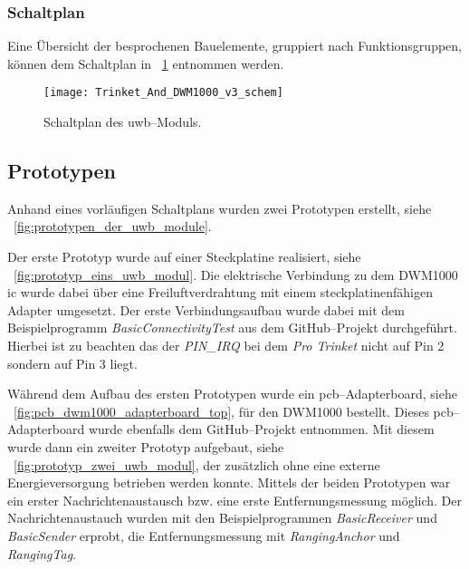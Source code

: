 \begin{comment}
- Schaltplan-Skizze
	- Besonderheiten (NetLabels)
	- SVG/PNG/PDF-Export
	- Gruppierung nach Funktionsgruppen
------------------------------------------------------------------------------------------
\end{comment}
\subsubsection{Schaltplan} \label{subsec:schaltplan_uwb_modul}

Eine Übersicht der besprochenen Bauelemente, gruppiert nach Funktionsgruppen, können dem Schaltplan in \figurename~\ref{fig:schaltplan_uwb_modul} entnommen werden.

\begin{figure}
	\texttt{[image: Trinket\_And\_DWM1000\_v3\_schem]}
	\caption{Schaltplan des \gls{uwb}--Moduls.}
	\label{fig:schaltplan_uwb_modul}
\end{figure}


\begin{comment}
------------------------------------------------------------------------------------------
- 1. Prototyp Aufbau auf einem Breadboard
	- UWB-Adapter von ...?
	- SMD Löttechnik
	- Funktionstest
	- Skript als Anhang
- 2. Prototyp Aufbau auf einem Lochstreifen
	- Kommunikations- und Entfernungsmessungstest
\end{comment}
\subsection{Prototypen}

Anhand eines vorläufigen Schaltplans wurden zwei Prototypen erstellt, siehe \figurename~\ref{fig:prototypen_der_uwb_module}.

Der erste Prototyp wurde auf einer Steckplatine realisiert, siehe \figurename~\ref{fig:prototyp_eins_uwb_modul}. Die elektrische Verbindung zu dem DWM1000 \gls{ic} wurde dabei über eine Freiluftverdrahtung mit einem steckplatinenfähigen Adapter umgesetzt. Der erste Verbindungsaufbau wurde dabei mit dem Beispielprogramm \textit{BasicConnectivityTest} aus dem GitHub--Projekt \cite{Trojer2015} durchgeführt. Hierbei ist zu beachten das der \textit{PIN\_IRQ} bei dem \textit{Pro Trinket} nicht auf Pin 2 sondern auf Pin 3 liegt.

Während dem Aufbau des ersten Prototypen wurde ein \gls{pcb}--Adapterboard, siehe \figurename~\ref{fig:pcb_dwm1000_adapterboard_top}, für den DWM1000 bestellt. Dieses \gls{pcb}--Adapterboard wurde ebenfalls dem GitHub--Projekt \cite{Trojer2015} entnommen. Mit diesem wurde dann ein zweiter Prototyp aufgebaut, siehe \figurename~\ref{fig:prototyp_zwei_uwb_modul}, der zusätzlich ohne eine externe Energieversorgung betrieben werden konnte. Mittels der beiden Prototypen war ein erster Nachrichtenaustausch bzw. eine erste Entfernungsmessung möglich. Der Nachrichtenaustauch wurden mit den Beispielprogrammen \textit{BasicReceiver} und \textit{BasicSender} erprobt, die Entfernungsmessung mit \textit{RangingAnchor} und \textit{RangingTag}.

